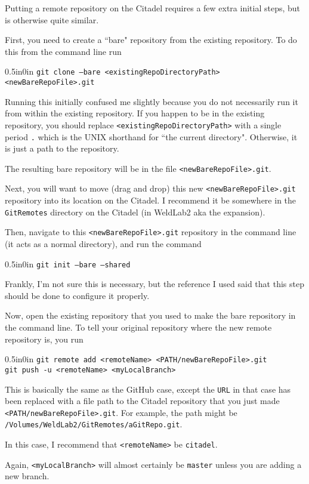 \documentclass[11pt]{article}
\newcommand{\code}[1]{\begin{adjustwidth}{0.5in}{0in}
    \texttt{#1}
    \end{adjustwidth}}
\begin{document}
Putting a remote repository on the Citadel requires a few extra initial steps, but is otherwise quite similar.  

First, you need to create a ``bare" repository from the existing repository.  To do this from the command line run

\code{git clone --bare <existingRepoDirectoryPath> <newBareRepoFile>.git}

Running this initially confused me slightly because you do not necessarily run it from within the existing repository.  If you happen to be in the existing repository, you should replace \texttt{<existingRepoDirectoryPath>} with a single period \texttt{.} which is the UNIX shorthand for ``the current directory".  Otherwise, it is just a path to the repository.

The resulting bare repository will be in the file \texttt{<newBareRepoFile>.git}.

Next, you will want to move (drag and drop) this new \texttt{<newBareRepoFile>.git} repository into its location on the Citadel.  I recommend it be somewhere in the \texttt{GitRemotes} directory on the Citadel (in WeldLab2 aka the expansion).

Then, navigate to this \texttt{<newBareRepoFile>.git} repository in the command line (it acts as a normal directory), and run the command

\code{git init --bare --shared}

Frankly, I'm not sure this is necessary, but the reference I used said that this step should be done to configure it properly.

Now, open the existing repository that you used to make the bare repository in the command line.  To tell your original repository where the new remote repository is, you run

\code{git remote add <remoteName> <PATH/newBareRepoFile>.git\\
git push -u <remoteName> <myLocalBranch>}  

This is basically the same as the GitHub case, except the \texttt{URL} in that case has been replaced with a file path to the Citadel repository that you just made \texttt{<PATH/newBareRepoFile>.git}.  For example, the path might be \texttt{/Volumes/WeldLab2/GitRemotes/aGitRepo.git}.

In this case, I recommend that \texttt{<remoteName>} be \texttt{citadel}.

Again, \texttt{<myLocalBranch>} will almost certainly be \texttt{master} unless you are adding a new branch.
\end{document}
